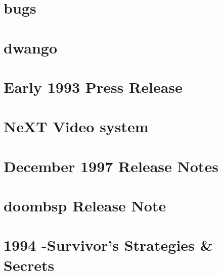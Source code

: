 \documentclass{book}
\begin{document}
      \chapter{bugs}
      
      \chapter{dwango}
      
      \chapter{Early 1993 Press Release}
      
      \chapter{NeXT Video system}
      
      \chapter{December 1997 Release Notes}
      
      \chapter{doombsp Release Note}
      
      \chapter{1994 -Survivor's Strategies \& Secrets}
      
    \cleartoleftpage %
    
    \blankpage
    \blankpage
\end{document}
